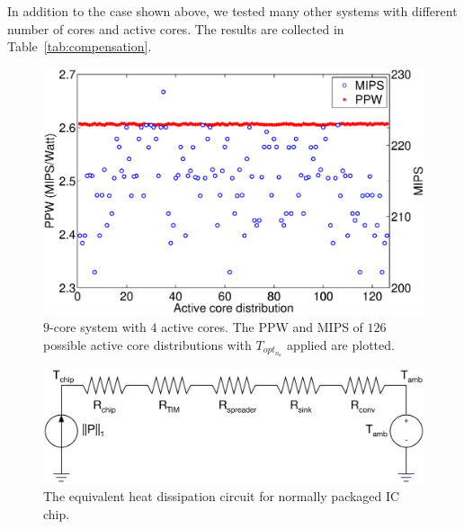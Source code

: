In addition to the case shown above, we tested many other systems with different number of cores and active cores. The results are collected in Table~\ref{tab:compensation}.

\begin{figure}
  \centering
  \includegraphics[width=0.9\columnwidth]{fig/mips_ppw.eps}
  \caption{$9$-core system with $4$ active cores. The PPW and MIPS of $126$ possible active core distributions with $T_{opt_{n_{a}}}$ applied are plotted.}
  \label{fig:mips_ppw}
\end{figure}
\begin{figure}
  \centering
  \includegraphics[width=0.8\columnwidth]{fig/resistor_line.eps}
  \caption{The equivalent heat dissipation circuit for normally
    packaged IC chip.}
  \label{fig:resistor_line}
\end{figure}



